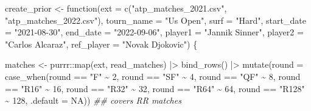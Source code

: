 \documentclass[
  letterpaper,
  DIV=11,
  numbers=noendperiod]{scrartcl}
\newenvironment{Shaded}{\begin{snugshade}}{\end{snugshade}}
\newcommand{\AttributeTok}[1]{\textcolor[rgb]{0.40,0.45,0.13}{#1}}
\newcommand{\ConstantTok}[1]{\textcolor[rgb]{0.56,0.35,0.01}{#1}}
\newcommand{\ControlFlowTok}[1]{\textcolor[rgb]{0.00,0.23,0.31}{#1}}
\newcommand{\DecValTok}[1]{\textcolor[rgb]{0.68,0.00,0.00}{#1}}
\newcommand{\DocumentationTok}[1]{\textcolor[rgb]{0.37,0.37,0.37}{\textit{#1}}}
\newcommand{\FunctionTok}[1]{\textcolor[rgb]{0.28,0.35,0.67}{#1}}
\newcommand{\NormalTok}[1]{\textcolor[rgb]{0.00,0.23,0.31}{#1}}
\newcommand{\OtherTok}[1]{\textcolor[rgb]{0.00,0.23,0.31}{#1}}
\newcommand{\SpecialCharTok}[1]{\textcolor[rgb]{0.37,0.37,0.37}{#1}}
\newcommand{\StringTok}[1]{\textcolor[rgb]{0.13,0.47,0.30}{#1}}
\begin{document}
\linespread{0.9}

\begin{Shaded}
\begin{Highlighting}[]
\NormalTok{create\_prior }\OtherTok{\textless{}{-}} \ControlFlowTok{function}\NormalTok{(}\AttributeTok{ext =} \FunctionTok{c}\NormalTok{(}\StringTok{"atp\_matches\_2021.csv"}\NormalTok{,}
                                 \StringTok{"atp\_matches\_2022.csv"}\NormalTok{),}
                         \AttributeTok{tourn\_name =} \StringTok{"Us Open"}\NormalTok{,}
                         \AttributeTok{surf =} \StringTok{"Hard"}\NormalTok{,}
                         \AttributeTok{start\_date =} \StringTok{"2021{-}08{-}30"}\NormalTok{,}
                         \AttributeTok{end\_date =} \StringTok{"2022{-}09{-}06"}\NormalTok{,}
                         \AttributeTok{player1 =} \StringTok{"Jannik Sinner"}\NormalTok{,}
                         \AttributeTok{player2 =} \StringTok{"Carlos Alcaraz"}\NormalTok{,}
                         \AttributeTok{ref\_player =} \StringTok{"Novak Djokovic"}\NormalTok{) \{}
  
\NormalTok{  matches }\OtherTok{\textless{}{-}}\NormalTok{ purrr}\SpecialCharTok{::}\FunctionTok{map}\NormalTok{(ext, read\_matches) }\SpecialCharTok{|\textgreater{}}
    \FunctionTok{bind\_rows}\NormalTok{() }\SpecialCharTok{|\textgreater{}}
    \FunctionTok{mutate}\NormalTok{(}\AttributeTok{round =} \FunctionTok{case\_when}\NormalTok{(round }\SpecialCharTok{==} \StringTok{"F"} \SpecialCharTok{\textasciitilde{}} \DecValTok{2}\NormalTok{,}
\NormalTok{                             round }\SpecialCharTok{==} \StringTok{"SF"} \SpecialCharTok{\textasciitilde{}} \DecValTok{4}\NormalTok{,}
\NormalTok{                             round }\SpecialCharTok{==} \StringTok{"QF"} \SpecialCharTok{\textasciitilde{}} \DecValTok{8}\NormalTok{,}
\NormalTok{                             round }\SpecialCharTok{==} \StringTok{"R16"} \SpecialCharTok{\textasciitilde{}} \DecValTok{16}\NormalTok{,}
\NormalTok{                             round }\SpecialCharTok{==} \StringTok{"R32"} \SpecialCharTok{\textasciitilde{}} \DecValTok{32}\NormalTok{,}
\NormalTok{                             round }\SpecialCharTok{==} \StringTok{"R64"} \SpecialCharTok{\textasciitilde{}} \DecValTok{64}\NormalTok{,}
\NormalTok{                             round }\SpecialCharTok{==} \StringTok{"R128"} \SpecialCharTok{\textasciitilde{}} \DecValTok{128}\NormalTok{,}
                             \AttributeTok{.default =} \ConstantTok{NA}\NormalTok{)) }\DocumentationTok{\#\# covers RR matches}
  

\end{Highlighting}
\end{Shaded}
\end{document}
